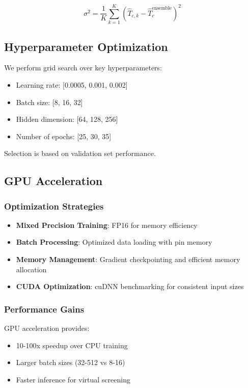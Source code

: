\documentclass[11pt,a4paper]{article}
\begin{document}
\begin{equation}
\sigma^2 = \frac{1}{K}\sum_{k=1}^{K}(\hat{T}_{c,k} - \hat{T}_c^{\text{ensemble}})^2
\end{equation}

\subsection{Hyperparameter Optimization}

We perform grid search over key hyperparameters:

\begin{itemize}
    \item Learning rate: [0.0005, 0.001, 0.002]
    \item Batch size: [8, 16, 32]
    \item Hidden dimension: [64, 128, 256]
    \item Number of epochs: [25, 30, 35]
\end{itemize}

Selection is based on validation set performance.

\subsection{GPU Acceleration}

\subsubsection{Optimization Strategies}

\begin{itemize}
    \item \textbf{Mixed Precision Training}: FP16 for memory efficiency
    \item \textbf{Batch Processing}: Optimized data loading with pin memory
    \item \textbf{Memory Management}: Gradient checkpointing and efficient memory allocation
    \item \textbf{CUDA Optimization}: cuDNN benchmarking for consistent input sizes
\end{itemize}

\subsubsection{Performance Gains}

GPU acceleration provides:
\begin{itemize}
    \item 10-100x speedup over CPU training
    \item Larger batch sizes (32-512 vs 8-16)
    \item Faster inference for virtual screening
\end{itemize}
\end{document}
